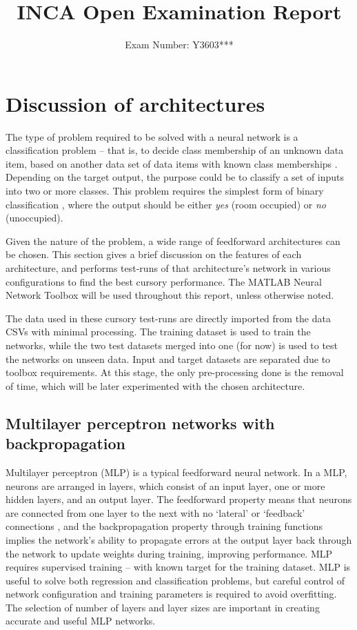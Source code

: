 \documentclass[10pt, oneside]{article}
\title{\vspace{-1.6cm}INCA Open Examination Report}
\author{Exam Number: Y3603***}
\date{}
\begin{document}
\maketitle
\section{Discussion of architectures} \label{sec:architectures}
The type of problem required to be solved with a neural network is a classification problem -- that is, to decide class membership of an unknown data item, based on another data set of data items with known class memberships \cite[Sec. 2]{Dreiseitl2002352}. Depending on the target output, the purpose could be to classify a set of inputs into two or more classes. This problem requires the simplest form of binary classification \cite[Fig. 4]{candanedo2016accurate}, where the output should be either \textit{yes} (room occupied) or \textit{no} (unoccupied). 

Given the nature of the problem, a wide range of feedforward architectures can be chosen. This section gives a brief discussion on the features of each architecture, and performs test-runs of that architecture's network in various configurations to find the best cursory performance. The MATLAB Neural Network Toolbox \cite{kohonen2014matlab} will be used throughout this report, unless otherwise noted.

The data used in these cursory test-runs are directly imported from the data CSVs with minimal processing. The training dataset is used to train the networks, while the two test datasets merged into one (for now) is used to test the networks on unseen data. Input and target datasets are separated due to toolbox requirements. At this stage, the only pre-processing done is the removal of time, which will be later experimented with the chosen architecture.

\subsection{Multilayer perceptron networks with backpropagation}

Multilayer perceptron (MLP) is a typical feedforward neural network. In a MLP, neurons are arranged in layers, which consist of an input layer, one or more hidden layers, and an output layer. The feedforward property means that neurons are connected from one layer to the next with no `lateral' or `feedback' connections \cite{som-lecture}, and the backpropagation property through training functions implies the network's ability to propagate errors at the output layer back through the network to update weights during training, improving performance. MLP requires supervised training -- with known target for the training dataset. MLP is useful to solve both regression and classification problems, but careful control of network configuration and training parameters is required to avoid overfitting. The selection of number of layers and layer sizes are important in creating accurate and useful MLP networks.
\end{document}
